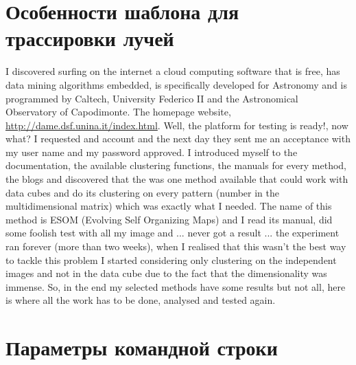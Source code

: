 \documentclass[11pt,fleqn,english,russian]{report} %
\begin{document}

\chapter{Особенности шаблона для трассировки лучей}

I discovered surfing on the internet a cloud computing software that is free, has data mining algorithms embedded, is specifically developed for Astronomy and is programmed by Caltech, University Federico II and the Astronomical Observatory of Capodimonte. The homepage website, \url{http://dame.dsf.unina.it/index.html}. Well, the platform for testing is ready!, now what? I requested and account and the next day they sent me an acceptance with my user name and my password approved.
I introduced myself to the documentation, the available clustering functions, the manuals for every method, the blogs and discovered that the was one method available that could work with data cubes and do its clustering on every pattern (number in the multidimensional matrix) which was exactly what I needed. The name of this method is ESOM (Evolving Self Organizing Maps) and I read its manual, did some foolish test with all my image and ... never got a result ... the experiment ran forever (more than two weeks), when I realised that this wasn't the best way to tackle this problem I started considering only clustering on the independent images and not in the data cube due to the fact that the dimensionality was immense. So, in the end my selected methods have some results but not all, here is where all the work has to be done, analysed and tested again.


\chapter{Параметры командной строки}
\end{document}
